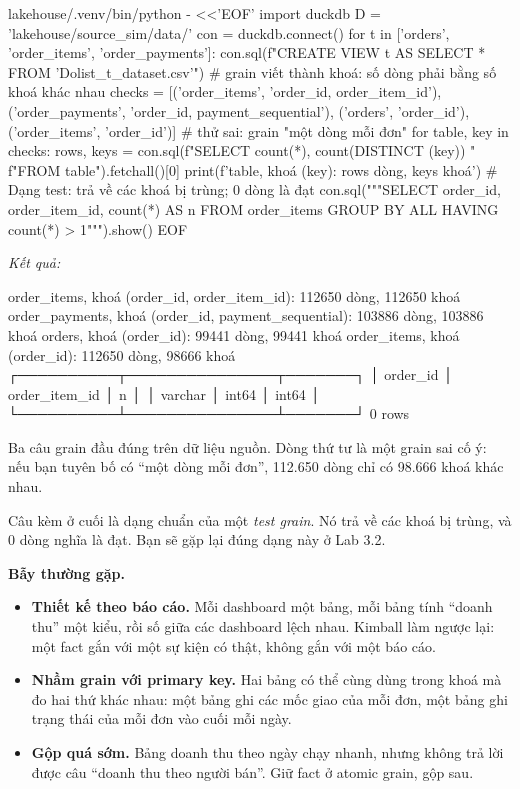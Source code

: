\begin{codeblock}
lakehouse/.venv/bin/python - <<'EOF'
import duckdb
D = 'lakehouse/source_sim/data/'
con = duckdb.connect()
for t in ['orders', 'order_items', 'order_payments']:
    con.sql(f"CREATE VIEW {t} AS SELECT * FROM '{D}olist_{t}_dataset.csv'")
# grain viết thành khoá: số dòng phải bằng số khoá khác nhau
checks = [('order_items', 'order_id, order_item_id'),
          ('order_payments', 'order_id, payment_sequential'),
          ('orders', 'order_id'),
          ('order_items', 'order_id')]   # thử sai: grain "một dòng mỗi đơn"
for table, key in checks:
    rows, keys = con.sql(f"SELECT count(*), count(DISTINCT ({key})) "
                         f"FROM {table}").fetchall()[0]
    print(f'{table}, khoá ({key}): {rows} dòng, {keys} khoá')
# Dạng test: trả về các khoá bị trùng; 0 dòng là đạt
con.sql("""SELECT order_id, order_item_id, count(*) AS n
           FROM order_items GROUP BY ALL HAVING count(*) > 1""").show()
EOF
\end{codeblock}
\textit{Kết quả:}
\begin{codeblock}
order_items, khoá (order_id, order_item_id): 112650 dòng, 112650 khoá
order_payments, khoá (order_id, payment_sequential): 103886 dòng, 103886 khoá
orders, khoá (order_id): 99441 dòng, 99441 khoá
order_items, khoá (order_id): 112650 dòng, 98666 khoá
┌──────────┬───────────────┬───────┐
│ order_id │ order_item_id │   n   │
│ varchar  │     int64     │ int64 │
└──────────┴───────────────┴───────┘
               0 rows
\end{codeblock}

Ba câu grain đầu đúng trên dữ liệu nguồn. Dòng thứ tư là một grain sai cố ý: nếu bạn tuyên bố  có ``một dòng mỗi đơn'', 112.650 dòng chỉ có 98.666 khoá khác nhau.

Câu  kèm  ở cuối là dạng chuẩn của một \textit{test grain}. Nó trả về các khoá bị trùng, và 0 dòng nghĩa là đạt. Bạn sẽ gặp lại đúng dạng này ở Lab 3.2.

\begin{luuy}
\textbf{Bẫy thường gặp.}
\begin{itemize}
  \item \textbf{Thiết kế theo báo cáo.} Mỗi dashboard một bảng, mỗi bảng tính ``doanh thu'' một kiểu, rồi số giữa các dashboard lệch nhau. Kimball làm ngược lại: một fact gắn với một sự kiện có thật, không gắn với một báo cáo.
  \item \textbf{Nhầm grain với primary key.} Hai bảng có thể cùng dùng  trong khoá mà đo hai thứ khác nhau: một bảng ghi các mốc giao của mỗi đơn, một bảng ghi trạng thái của mỗi đơn vào cuối mỗi ngày.
  \item \textbf{Gộp quá sớm.} Bảng doanh thu theo ngày chạy nhanh, nhưng không trả lời được câu ``doanh thu theo người bán''. Giữ fact ở atomic grain, gộp sau.
\end{itemize}
\end{luuy}

